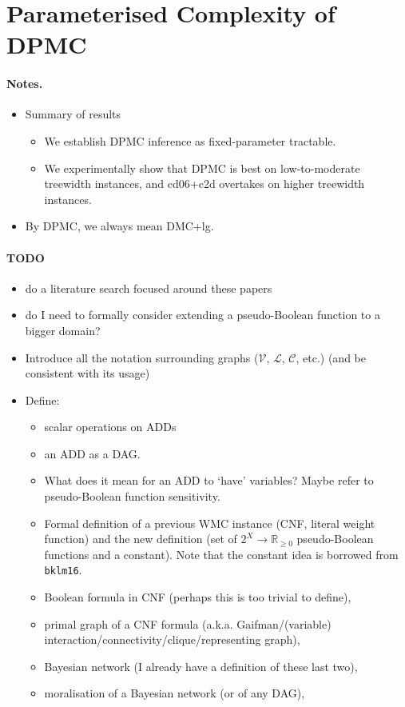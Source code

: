 \documentclass{article}
\theoremstyle{definition}
\theoremstyle{remark}
\begin{document}
\section{Parameterised Complexity of \textsc{DPMC}}

\paragraph{Notes.}
\begin{itemize}
\item Summary of results
  \begin{itemize}
  \item We establish \textsc{DPMC} inference as fixed-parameter tractable.
  \item We experimentally show that \textsc{DPMC} is best on low-to-moderate
    treewidth instances, and cd06+c2d overtakes on higher treewidth instances.
  \end{itemize}
\item By \textsc{DPMC}, we always mean DMC+lg.
\end{itemize}

\paragraph{TODO}
\begin{itemize}
\item do a literature search focused around these papers
\item do I need to formally consider extending a pseudo-Boolean function to a
  bigger domain?
\item Introduce all the notation surrounding graphs ($\mathcal{V}$,
  $\mathcal{L}$, $\mathcal{C}$, etc.) (and be consistent with its usage)
\item Define:
  \begin{itemize}
  \item scalar operations on ADDs
  \item an ADD as a DAG.
  \item What does it mean for an ADD to `have' variables? Maybe refer to
    pseudo-Boolean function sensitivity.
  \item Formal definition of a previous WMC instance (CNF, literal weight
    function) and the new definition (set of $2^{X} \to \mathbb{R}_{\ge 0}$
    pseudo-Boolean functions and a constant). Note that the constant idea is
    borrowed from \texttt{bklm16}.
  \item Boolean formula in CNF (perhaps this is too trivial to define),
  \item primal graph of a CNF formula (a.k.a.
    Gaifman/(variable) interaction/connectivity/clique/representing graph),
  \item Bayesian network (I already have a definition of these last two),
  \item moralisation of a Bayesian network (or of any DAG),
  \end{itemize}
\end{itemize}
\end{document}
